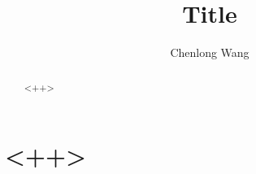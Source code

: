 \documentclass[12pt]{geophysics}
\begin{document}
\title{Title}
\author{ Chenlong Wang\footnotemark[1] }

\address{
\footnotemark[1] School of Ocean and Earth Science,\\
Tongji University,\\
Siping Road 1239, Shanghai, 200092, China\\
}


\maketitle
\onecolumn

\begin{abstract}
<++>
\end{abstract}

\section{<++>}
\end{document}
